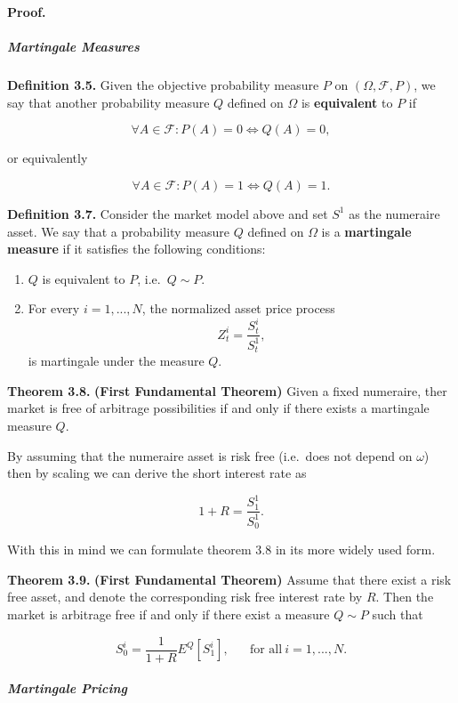 \documentclass[
]{article}
\providecommand{\tightlist}{%
  \setlength{\itemsep}{0pt}\setlength{\parskip}{0pt}}
\begin{document}
\textbf{Proof.}

\hypertarget{martingale-measures}{%
\subparagraph{Martingale Measures}\label{martingale-measures}}

\textbf{Definition 3.5.} Given the objective probability measure \(P\)
on \((\Omega,\mathcal{F},P)\), we say that another probability measure
\(Q\) defined on \(\Omega\) is \textbf{equivalent} to \(P\) if

\[
\forall A\in\mathcal{F}:P(A)=0\iff Q(A)=0,
\]

or equivalently

\[
\forall A\in\mathcal{F}:P(A)=1\iff Q(A)=1.
\]

\textbf{Definition 3.7.} Consider the market model above and set \(S^1\)
as the numeraire asset. We say that a probability measure \(Q\) defined
on \(\Omega\) is a \textbf{martingale measure} if it satisfies the
following conditions:

\begin{enumerate}
\def\labelenumi{\arabic{enumi}.}
\tightlist
\item
  \(Q\) is equivalent to \(P\), i.e.~\(Q\sim P\).
\item
  For every \(i=1,...,N\), the normalized asset price process \[
    Z_t^i=\frac{S_t^i}{S_t^1},
    \] is martingale under the measure \(Q\).
\end{enumerate}

\textbf{Theorem 3.8.} \textbf{(First Fundamental Theorem)} Given a fixed
numeraire, ther market is free of arbitrage possibilities if and only if
there exists a martingale measure \(Q\).

By assuming that the numeraire asset is risk free (i.e.~does not depend
on \(\omega\)) then by scaling we can derive the short interest rate as

\[
1+R=\frac{S_1^1}{S_0^1}.
\]

With this in mind we can formulate theorem 3.8 in its more widely used
form.

\textbf{Theorem 3.9.} \textbf{(First Fundamental Theorem)} Assume that
there exist a risk free asset, and denote the corresponding risk free
interest rate by \(R\). Then the market is arbitrage free if and only if
there exist a measure \(Q\sim P\) such that

\[
S_0^i=\frac{1}{1+R}E^Q[S_1^i],\hspace{20pt}\text{for all}\ i=1,...,N.\tag{3.9}
\]

\hypertarget{martingale-pricing}{%
\subparagraph{Martingale Pricing}\label{martingale-pricing}}
\end{document}
